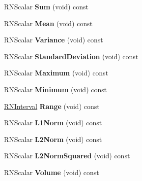 \begin{DoxyCompactItemize}
\item 
R\+N\+Scalar {\bfseries Sum} (void) const \hypertarget{class_r3_grid_a442881ed78cd7529ec2553e962bbee32}{}\label{class_r3_grid_a442881ed78cd7529ec2553e962bbee32}

\item 
R\+N\+Scalar {\bfseries Mean} (void) const \hypertarget{class_r3_grid_a94d5131f557c70b1eddb9f3027e1f1d1}{}\label{class_r3_grid_a94d5131f557c70b1eddb9f3027e1f1d1}

\item 
R\+N\+Scalar {\bfseries Variance} (void) const \hypertarget{class_r3_grid_a2f1d640bcc02f0b69568751e5fc6129c}{}\label{class_r3_grid_a2f1d640bcc02f0b69568751e5fc6129c}

\item 
R\+N\+Scalar {\bfseries Standard\+Deviation} (void) const \hypertarget{class_r3_grid_aeb1547eb08ba34eabe10c91c88f8db19}{}\label{class_r3_grid_aeb1547eb08ba34eabe10c91c88f8db19}

\item 
R\+N\+Scalar {\bfseries Maximum} (void) const \hypertarget{class_r3_grid_ab1c3855abd356d4f859783b270e2c18d}{}\label{class_r3_grid_ab1c3855abd356d4f859783b270e2c18d}

\item 
R\+N\+Scalar {\bfseries Minimum} (void) const \hypertarget{class_r3_grid_a57b0b540031dec0c0b0667388802d421}{}\label{class_r3_grid_a57b0b540031dec0c0b0667388802d421}

\item 
\hyperlink{class_r_n_interval}{R\+N\+Interval} {\bfseries Range} (void) const \hypertarget{class_r3_grid_a16dada6237aa354105da865ceed91309}{}\label{class_r3_grid_a16dada6237aa354105da865ceed91309}

\item 
R\+N\+Scalar {\bfseries L1\+Norm} (void) const \hypertarget{class_r3_grid_a9d75fff6eaa62e629d409cec822abfa7}{}\label{class_r3_grid_a9d75fff6eaa62e629d409cec822abfa7}

\item 
R\+N\+Scalar {\bfseries L2\+Norm} (void) const \hypertarget{class_r3_grid_a60ad29ae5b8c7cca534a788ef9219fa5}{}\label{class_r3_grid_a60ad29ae5b8c7cca534a788ef9219fa5}

\item 
R\+N\+Scalar {\bfseries L2\+Norm\+Squared} (void) const \hypertarget{class_r3_grid_a0dc299cf0083e9e3de6bf8676ee5694e}{}\label{class_r3_grid_a0dc299cf0083e9e3de6bf8676ee5694e}

\item 
R\+N\+Scalar {\bfseries Volume} (void) const \hypertarget{class_r3_grid_a1335f955ca44933b61f2df596bdabad7}{}\label{class_r3_grid_a1335f955ca44933b61f2df596bdabad7}


\end{DoxyCompactItemize}
